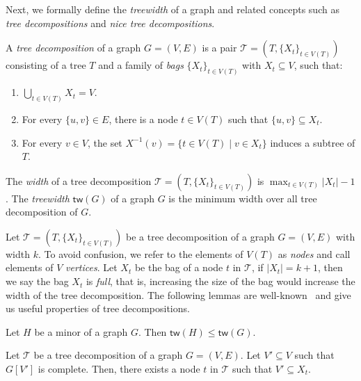 \documentclass[a4paper,UKenglish,cleveref, autoref, thm-restate, numberwithinsect]{lipics-v2021}
\newcommand{\tw}{\mathsf{tw}}
\begin{document}
Next, we formally define the \emph{treewidth} of a graph and related concepts such as \emph{tree decompositions} and \emph{nice tree decompositions}.

\begin{definition} \label{def:tree_decomposition}
A {\em tree decomposition} of a graph $G=(V,E)$ is a pair $\mathcal{T}=(T,\{X_t\}_{t\in V(T)})$ consisting of a tree $T$ and a family of \emph{bags} $\{X_t\}_{t\in V(T)}$ with $X_t\subseteq V$, such that:
\begin{enumerate}
    \item $\bigcup_{t\in V(T)}X_t=V$. \label{condition_1_tree_decomposition}
    \item For every $\{u, v\}\in E$, there is a node $t\in V(T)$ such that $\{u, v\}\subseteq X_t$. \label{condition_2_tree_decomposition}
    \item For every $v\in V$, the set $X^{-1}(v)=\{t\in V(T) \mid v\in X_t\}$ induces a subtree of $T$. \label{condition_3_tree_decomposition}
\end{enumerate}
The {\em width} of a tree decomposition $\mathcal{T}=(T,\{X_t\}_{t\in V(T)})$ is $\max_{t\in V(T)}|X_t|-1$. The {\em treewidth} $\tw(G)$ of a graph $G$ is the minimum width over all tree decomposition of $G$. 
\end{definition}
Let $\mathcal{T}=(T,\{X_t\}_{t\in V(T)})$ be a tree decomposition of a graph $G=(V,E)$ with width $k$. To avoid confusion, we refer to the elements of $V(T)$ as \emph{nodes} and call elements of $V$ \emph{vertices}.
Let $X_t$ be the bag of a node $t$ in $\mathcal{T}$, if $|X_t|=k+1$, then we say the bag $X_t$ is \emph{full}, that is, increasing the size of the bag would increase the width of the tree decomposition.
The following lemmas are well-known~\cite{arnborg1990forbidden,bodlaender2006safe,Die16} and give us useful properties of tree decompositions.

\begin{lemma}\label{lem:twminor}
Let $H$ be a minor of a graph $G$. Then $\tw(H)\le\tw(G)$.
\end{lemma}
   
\begin{lemma}
\label{lem:cliquebag}
    Let $\mathcal{T}$ be a tree decomposition of a graph $G=(V,E)$. Let $V'\subseteq V$ such that $G[V']$ is complete. Then, there exists a node $t$ in $\mathcal{T}$ such that $V'\subseteq X_t$. 
\end{lemma}
\end{document}
